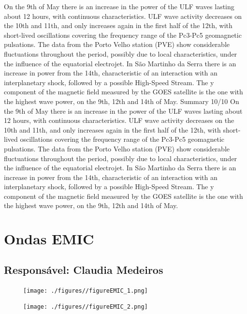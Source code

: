 \documentclass[a4paper, 10pt]{article}
\begin{document}
                     On the 9th of May there is an increase in the power of the ULF waves lasting
about 12 hours, with continuous characteristics. ULF wave activity decreases
on the 10th and 11th, and only increases again in the first half of the 12th,
with short-lived oscillations covering the frequency range of the Pc3-Pc5
geomagnetic pulsations. The data from the Porto Velho station (PVE) show
considerable fluctuations throughout the period, possibly due to local
characteristics, under the influence of the equatorial electrojet. In São
Martinho da Serra there is an increase in power from the 14th, characteristic
of an interaction with an interplanetary shock, followed by a possible
High-Speed Stream. The y component of the magnetic field measured by
the GOES satellite is the one with the highest wave power, on the 9th, 12th
and 14th of May.
Summary
10/10
On the 9th of May there is an increase in the power of the ULF waves lasting about 12 hours, with continuous characteristics. ULF wave activity decreases on the 10th and 11th, and only increases again in the first half of the 12th, with short-lived oscillations covering the frequency range of the Pc3-Pc5 geomagnetic pulsations. The data from the Porto Velho station (PVE) show considerable fluctuations throughout the period, possibly due to local characteristics, under the influence of the equatorial electrojet. In São Martinho da Serra there is an increase in power from the 14th, characteristic of an interaction with an interplanetary shock, followed by a possible High-Speed Stream. The y component of the magnetic field measured by the GOES satellite is the one with the highest wave power, on the 9th, 12th and 14th of May.\section{Ondas EMIC} 
 \subsection{Responsável: Claudia Medeiros} 
 
\begin{figure}[H]
    
                        \centering
   
                             \texttt{[image: ./figures//figureEMIC\_1.png]}

                        \end{figure}

                     \begin{figure}[H]
    
                        \centering
   
                             \texttt{[image: ./figures//figureEMIC\_2.png]}

                        \end{figure}
\end{document}
